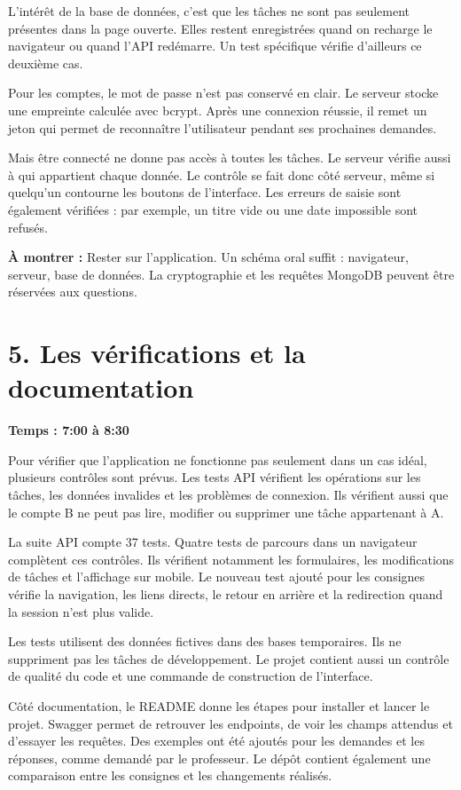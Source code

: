 \documentclass[11pt,a4paper]{article}
\newcommand{\partie}[2]{\section*{\textcolor{forest}{#1}}\textbf{Temps : #2}\par}
\newcommand{\action}[1]{\par\textcolor{muted}{\textbf{À montrer :} #1}\par}
\begin{document}
L'intérêt de la base de données, c'est que les tâches ne sont pas seulement présentes dans la page ouverte. Elles restent enregistrées quand on recharge le navigateur ou quand l'API redémarre. Un test spécifique vérifie d'ailleurs ce deuxième cas.

Pour les comptes, le mot de passe n'est pas conservé en clair. Le serveur stocke une empreinte calculée avec bcrypt. Après une connexion réussie, il remet un jeton qui permet de reconnaître l'utilisateur pendant ses prochaines demandes.

Mais être connecté ne donne pas accès à toutes les tâches. Le serveur vérifie aussi à qui appartient chaque donnée. Le contrôle se fait donc côté serveur, même si quelqu'un contourne les boutons de l'interface. Les erreurs de saisie sont également vérifiées : par exemple, un titre vide ou une date impossible sont refusés.

\action{Rester sur l'application. Un schéma oral suffit : navigateur, serveur, base de données. La cryptographie et les requêtes MongoDB peuvent être réservées aux questions.}
\partie{5. Les vérifications et la documentation}{7:00 à 8:30}

Pour vérifier que l'application ne fonctionne pas seulement dans un cas idéal, plusieurs contrôles sont prévus. Les tests API vérifient les opérations sur les tâches, les données invalides et les problèmes de connexion. Ils vérifient aussi que le compte B ne peut pas lire, modifier ou supprimer une tâche appartenant à A.

La suite API compte 37 tests. Quatre tests de parcours dans un navigateur complètent ces contrôles. Ils vérifient notamment les formulaires, les modifications de tâches et l'affichage sur mobile. Le nouveau test ajouté pour les consignes vérifie la navigation, les liens directs, le retour en arrière et la redirection quand la session n'est plus valide.

Les tests utilisent des données fictives dans des bases temporaires. Ils ne suppriment pas les tâches de développement. Le projet contient aussi un contrôle de qualité du code et une commande de construction de l'interface.

Côté documentation, le README donne les étapes pour installer et lancer le projet. Swagger permet de retrouver les endpoints, de voir les champs attendus et d'essayer les requêtes. Des exemples ont été ajoutés pour les demandes et les réponses, comme demandé par le professeur. Le dépôt contient également une comparaison entre les consignes et les changements réalisés.
\end{document}
